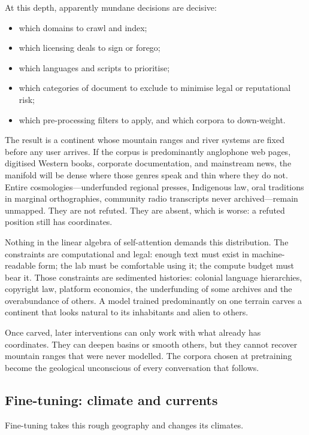 At this depth, apparently mundane decisions are decisive:

\begin{itemize}
  \item which domains to crawl and index;
  \item which licensing deals to sign or forego;
  \item which languages and scripts to prioritise;
  \item which categories of document to exclude to minimise legal or reputational risk;
  \item which pre-processing filters to apply, and which corpora to down-weight.
\end{itemize}

The result is a continent whose mountain ranges and river systems are fixed before any user arrives. If the corpus is predominantly anglophone web pages, digitised Western books, corporate documentation, and mainstream news, the manifold will be dense where those genres speak and thin where they do not. Entire cosmologies---underfunded regional presses, Indigenous law, oral traditions in marginal orthographies, community radio transcripts never archived---remain unmapped. They are not refuted. They are absent, which is worse: a refuted position still has coordinates.

Nothing in the linear algebra of self-attention demands this distribution. The constraints are computational and legal: enough text must exist in machine-readable form; the lab must be comfortable using it; the compute budget must bear it. Those constraints are sedimented histories: colonial language hierarchies, copyright law, platform economics, the underfunding of some archives and the overabundance of others. A model trained predominantly on one terrain carves a continent that looks natural to its inhabitants and alien to others.

Once carved, later interventions can only work with what already has coordinates. They can deepen basins or smooth others, but they cannot recover mountain ranges that were never modelled. The corpora chosen at pretraining become the geological unconscious of every conversation that follows.

\subsection{Fine-tuning: climate and currents}

Fine-tuning takes this rough geography and changes its climates.

